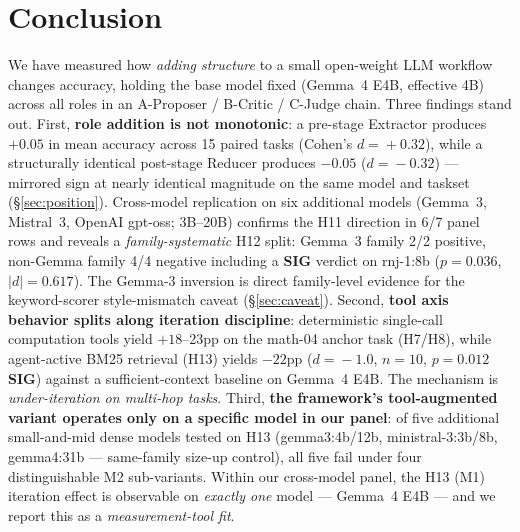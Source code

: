 \documentclass[11pt]{article}
\newcommand{\sig}{\textbf{SIG}}
\begin{document}
\section{Conclusion}

We have measured how \emph{adding structure} to a small open-weight LLM workflow changes accuracy, holding the base model fixed (Gemma~4 E4B, effective 4B) across all roles in an A-Proposer / B-Critic / C-Judge chain. Three findings stand out. First, \textbf{role addition is not monotonic}: a pre-stage Extractor produces $+0.05$ in mean accuracy across 15 paired tasks (Cohen's $d\!=\!+0.32$), while a structurally identical post-stage Reducer produces $-0.05$ ($d\!=\!-0.32$) --- mirrored sign at nearly identical magnitude on the same model and taskset (\S\ref{sec:position}). Cross-model replication on six additional models (Gemma~3, Mistral~3, OpenAI gpt-oss; 3B--20B) confirms the H11 direction in 6/7 panel rows and reveals a \emph{family-systematic} H12 split: Gemma~3 family 2/2 positive, non-Gemma family 4/4 negative including a \sig{} verdict on rnj-1:8b ($p\!=\!0.036$, $|d|\!=\!0.617$). The Gemma-3 inversion is direct family-level evidence for the keyword-scorer style-mismatch caveat (\S\ref{sec:caveat}). Second, \textbf{tool axis behavior splits along iteration discipline}: deterministic single-call computation tools yield $+18$--23pp on the math-04 anchor task (H7/H8), while agent-active BM25 retrieval (H13) yields $-22$pp ($d\!=\!-1.0$, $n\!=\!10$, $p\!=\!0.012$ \sig) against a sufficient-context baseline on Gemma~4 E4B. The mechanism is \emph{under-iteration on multi-hop tasks}. Third, \textbf{the framework's tool-augmented variant operates only on a specific model in our panel}: of five additional small-and-mid dense models tested on H13 (gemma3:4b/12b, ministral-3:3b/8b, gemma4:31b --- same-family size-up control), all five fail under four distinguishable M2 sub-variants. Within our cross-model panel, the H13 (M1) iteration effect is observable on \emph{exactly one} model --- Gemma~4 E4B --- and we report this as a \emph{measurement-tool fit}.
\end{document}
